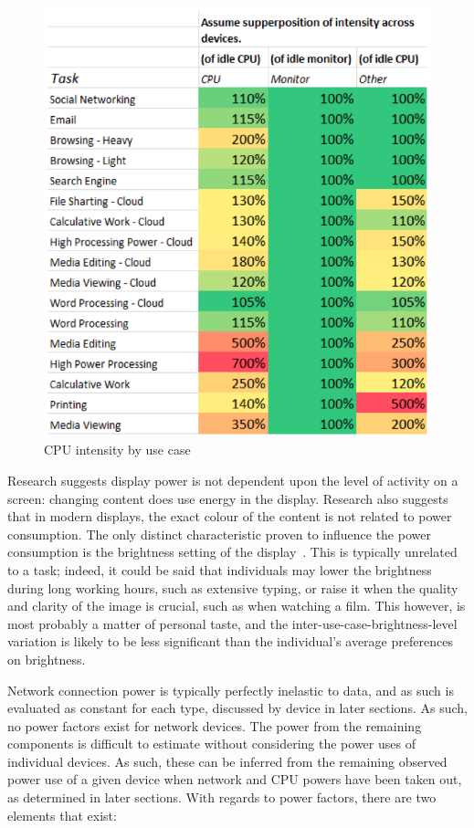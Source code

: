 \documentclass[conference]{IEEEtran}
\begin{document}
\begin{figure}[!ht]
\centering
\includegraphics[width=0.9\columnwidth]{images/cpuintensity_usecase.png}
\caption{CPU intensity by use case}
\label{fig:cpuintensity} 
\end{figure}

Research suggests display power is not dependent upon the level of
activity on a screen: changing content does use energy in the
display. Research also suggests that in modern displays, the exact
colour of the content is not related to power consumption. The only
distinct characteristic proven to influence the power consumption is
the brightness setting of the display~\cite{malmodin-et-al:2014}. This
is typically unrelated to a task; indeed, it could be said that
individuals may lower the brightness during long working hours, such
as extensive typing, or raise it when the quality and clarity of the
image is crucial, such as when watching a film. This however, is most
probably a matter of personal taste, and the
inter-use-case-brightness-level variation is likely to be less
significant than the individual’s average preferences on brightness.

Network connection power is typically perfectly inelastic to data, and
as such is evaluated as constant for each type, discussed by device in
later sections. As such, no power factors exist for network
devices. The power from the remaining components is difficult to
estimate without considering the power uses of individual devices. As
such, these can be inferred from the remaining observed power use of a
given device when network and CPU powers have been taken out, as
determined in later sections. With regards to power factors, there are
two elements that exist:
\end{document}
